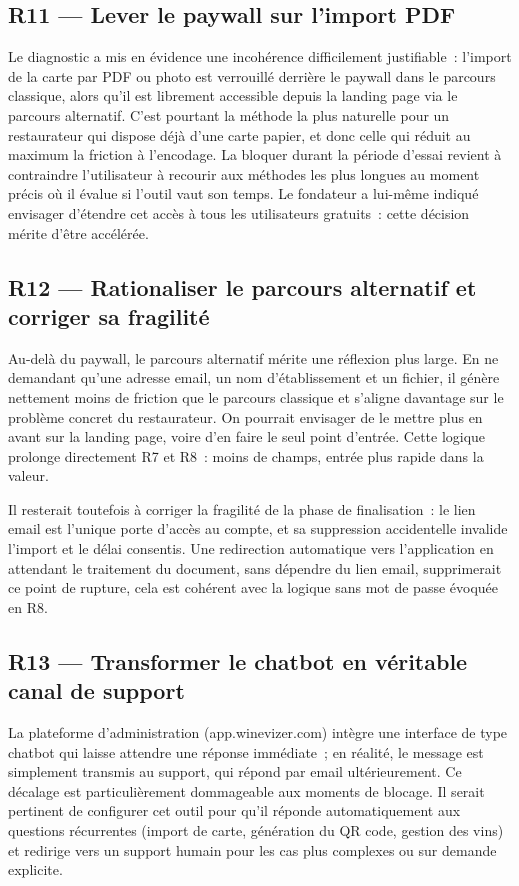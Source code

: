 \documentclass[12pt, a4paper]{article}
\begin{document}
\subsection{R11 — Lever le paywall sur l'import PDF}

Le diagnostic a mis en évidence une incohérence difficilement justifiable~: l'import de la carte
par PDF ou photo est verrouillé derrière le paywall dans le parcours classique, alors qu'il est
librement accessible depuis la landing page via le parcours alternatif. C'est pourtant la
méthode la plus naturelle pour un restaurateur qui dispose déjà d'une carte papier, et donc
celle qui réduit au maximum la friction à l'encodage. La bloquer durant la période d'essai
revient à contraindre l'utilisateur à recourir aux méthodes les plus longues au moment précis
où il évalue si l'outil vaut son temps. Le fondateur a lui-même indiqué envisager d'étendre
cet accès à tous les utilisateurs gratuits~: cette décision mérite d'être accélérée.

\subsection{R12 — Rationaliser le parcours alternatif et corriger sa fragilité}

Au-delà du paywall, le parcours alternatif mérite une réflexion plus large. En ne demandant
qu'une adresse email, un nom d'établissement et un fichier, il génère nettement moins de
friction que le parcours classique et s'aligne davantage sur le problème concret du restaurateur.
On pourrait envisager de le mettre plus en avant sur la landing page, voire d'en faire le seul point
d'entrée. Cette logique prolonge directement R7 et R8~: moins de champs, entrée plus
rapide dans la valeur.

Il resterait toutefois à corriger la fragilité de la phase de finalisation~: le lien email est
l'unique porte d'accès au compte, et sa suppression accidentelle invalide l'import et le délai
consentis. Une redirection automatique vers l'application en attendant le traitement du document,
sans dépendre du lien email, supprimerait ce point de rupture, cela est cohérent avec la logique
sans mot de passe évoquée en R8.

\subsection{R13 — Transformer le chatbot en véritable canal de support}

La plateforme d'administration (app.winevizer.com) intègre une interface de type chatbot qui laisse attendre une réponse
immédiate~; en réalité, le message est simplement transmis au support, qui répond par email
ultérieurement. Ce décalage est particulièrement dommageable aux moments de blocage.
Il serait pertinent de configurer cet outil pour qu'il réponde automatiquement aux questions
récurrentes (import de carte, génération du QR code, gestion des vins) et redirige vers
un support humain pour les cas plus complexes ou sur demande explicite.
\end{document}
